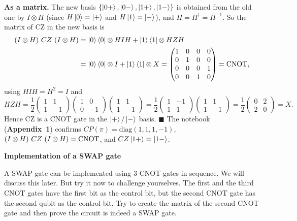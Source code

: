 \documentclass[a4paper, 10pt]{article}
\begin{document}
\begin{solution}
	\noindent \textbf{As a matrix.} The new basis \( \{\ket{0+}, \ket{0-}, \ket{1+}, \ket{1-}\} \) is obtained from the old one by \( I \otimes H \) (since \( H\ket{0} = \ket{+} \) and \( H\ket{1} = \ket{-} \)), and \( H = H^{\dagger} = H^{-1} \).
	So the matrix of CZ in the new basis is
	\begin{align*}
		\left(I \otimes H\right)\, CZ \,\left(I \otimes H\right)
		 & = \ket{0}\bra{0} \otimes HIH + \ket{1}\bra{1} \otimes HZH \\
		 & = \ket{0}\bra{0} \otimes I + \ket{1}\bra{1} \otimes X
		= \begin{pmatrix}
			  1 & 0 & 0 & 0 \\
			  0 & 1 & 0 & 0 \\
			  0 & 0 & 0 & 1 \\
			  0 & 0 & 1 & 0
		  \end{pmatrix}
		= \mathrm{CNOT},
	\end{align*}
	using \( HIH = H^2 = I \) and
	\[
		HZH
		= \frac{1}{2}\begin{pmatrix} 1 & 1 \\ 1 & -1 \end{pmatrix}\begin{pmatrix} 1 & 0 \\ 0 & -1 \end{pmatrix}\begin{pmatrix} 1 & 1 \\ 1 & -1 \end{pmatrix}
		= \frac{1}{2}\begin{pmatrix} 1 & -1 \\ 1 & 1 \end{pmatrix}\begin{pmatrix} 1 & 1 \\ 1 & -1 \end{pmatrix}
		= \frac{1}{2}\begin{pmatrix} 0 & 2 \\ 2 & 0 \end{pmatrix}
		= X .
	\]
	Hence CZ is a CNOT gate in the \( \ket{+}/\ket{-} \) basis. \( \blacksquare \)
	The notebook (\textbf{Appendix~1}) confirms \( CP(\pi) = \mathrm{diag}(1,1,1,-1) \), \( \left(I \otimes H\right)\, CZ \,\left(I \otimes H\right) = \mathrm{CNOT} \), and \( CZ\ket{1+} = \ket{1-} \).
\end{solution}

\begin{problem}
\textbf{Implementation of a SWAP gate}
\par A SWAP gate can be implemented using 3 CNOT gates in sequence. We will discuss this later.
But try it now to challenge yourselves.
The first and the third CNOT gates have the first bit as the control bit,
but the second CNOT gate has the second qubit as the control bit.
Try to create the matrix of the second CNOT gate and then prove the circuit is indeed a SWAP gate.
\end{problem}
\end{document}
